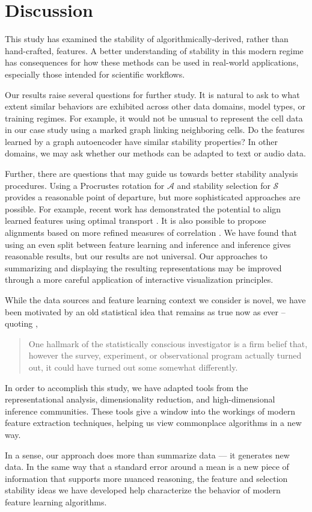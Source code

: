 
\section{Discussion}

This study has examined the stability of algorithmically-derived, rather than
hand-crafted, features. A better understanding of stability in this modern
regime has consequences for how these methods can be used in real-world
applications, especially those intended for scientific workflows.

Our results raise several questions for further study. It is natural to ask
to what extent similar behaviors are exhibited across other data domains, model
types, or training regimes. For example, it would not be unusual to represent
the cell data in our case study using a marked graph linking neighboring cells.
Do the features learned by a graph autoencoder have similar stability
properties? In other domains, we may ask whether our methods can be adapted to
text or audio data.

Further, there are questions that may guide us towards better stability analysis
procedures. Using a Procrustes rotation for $\mathcal{A}$ and stability
selection for $\mathcal{S}$ provides a reasonable point of departure, but more
sophisticated approaches are possible. For example, recent work has demonstrated
the potential to align learned features using optimal transport
\citep{wang2020federated }. It is also possible to propose alignments based on
more refined measures of correlation \citep{josse2016measuring,
  azadkia2019simple}. We have found that using an even split between
feature learning and inference and inference gives reasonable results, but our
results are not universal. Our approaches to summarizing and displaying the
resulting representations may be improved through a more careful application of
interactive visualization principles.

While the data sources and feature learning context we consider is novel, we
have been motivated by an old statistical idea that remains as true now as ever
-- quoting \citep{mosteller1977data},

\begin{quote}
One hallmark of the statistically conscious investigator is a firm belief that,
however the survey, experiment, or observational program actually turned out, it
could have turned out some somewhat differently.
\end{quote}

In order to accomplish this study, we have adapted tools from the
representational analysis, dimensionality reduction, and high-dimensional
inference communities. These tools give a window into the workings of modern
feature extraction techniques, helping us view commonplace algorithms in a new
way.

In a sense, our approach does more than summarize data — it generates new data.
In the same way that a standard error around a mean is a new piece of
information that supports more nuanced reasoning, the feature and selection
stability ideas we have developed help characterize the behavior of modern
feature learning algorithms.
